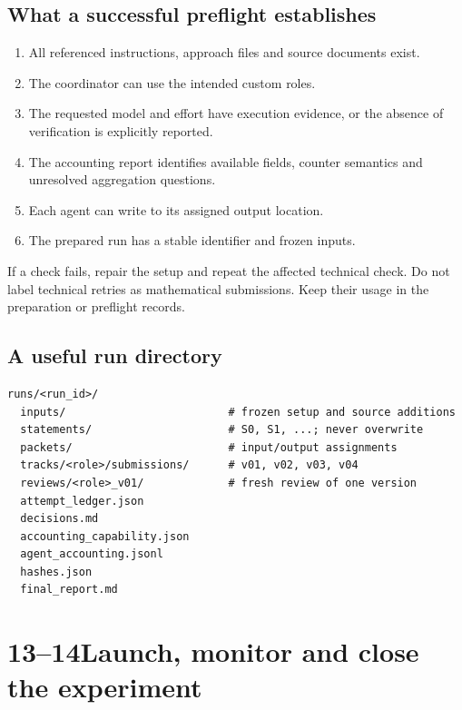 \documentclass[11pt,a4paper]{article}
\newcommand{\step}[2]{\section*{#1\quad #2}}
\begin{document}
\subsection*{What a successful preflight establishes}
\begin{enumerate}
\item All referenced instructions, approach files and source documents exist.
\item The coordinator can use the intended custom roles.
\item The requested model and effort have execution evidence, or the absence of verification is explicitly reported.
\item The accounting report identifies available fields, counter semantics and unresolved aggregation questions.
\item Each agent can write to its assigned output location.
\item The prepared run has a stable identifier and frozen inputs.
\end{enumerate}

If a check fails, repair the setup and repeat the affected technical check. Do not label technical retries as mathematical submissions. Keep their usage in the preparation or preflight records.

\subsection*{A useful run directory}
\begin{lstlisting}
runs/<run_id>/
  inputs/                         # frozen setup and source additions
  statements/                     # S0, S1, ...; never overwrite
  packets/                        # input/output assignments
  tracks/<role>/submissions/      # v01, v02, v03, v04
  reviews/<role>_v01/             # fresh review of one version
  attempt_ledger.json
  decisions.md
  accounting_capability.json
  agent_accounting.jsonl
  hashes.json
  final_report.md
\end{lstlisting}
\newpage

\step{13--14}{Launch, monitor and close the experiment}
\end{document}
